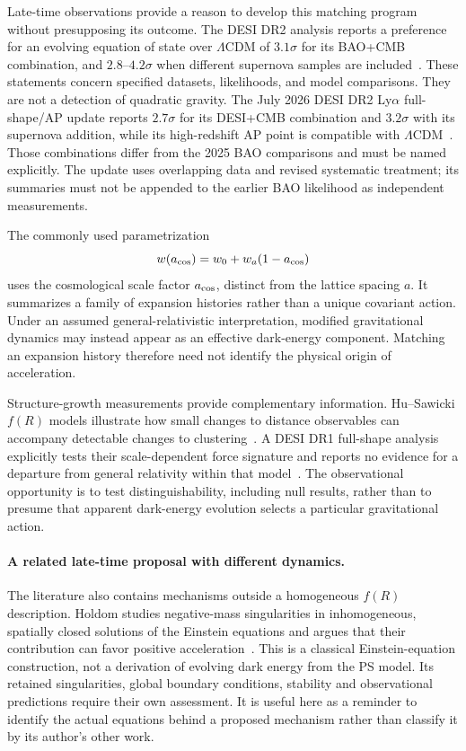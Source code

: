 Late-time observations provide a reason to develop this matching program without presupposing its outcome.  The DESI DR2 analysis reports a preference for an evolving equation of state over $\Lambda$CDM of $3.1\sigma$ for its BAO+CMB combination, and $2.8$--$4.2\sigma$ when different supernova samples are included~\cite{DESI:2025DR2}.  These statements concern specified datasets, likelihoods, and model comparisons.  They are not a detection of quadratic gravity.  The July 2026 DESI DR2 Ly$\alpha$ full-shape/AP update reports $2.7\sigma$ for its DESI+CMB combination and $3.2\sigma$ with its supernova addition, while its high-redshift AP point is compatible with $\Lambda$CDM~\cite{DESI:2026AP}.  Those combinations differ from the 2025 BAO comparisons and must be named explicitly.  The update uses overlapping data and revised systematic treatment; its summaries must not be appended to the earlier BAO likelihood as independent measurements.

The commonly used parametrization
\begin{equation}
 w(a_{\rm cos})=w_0+w_a(1-a_{\rm cos})
 \label{eq:cpl-dark-energy}
\end{equation}
uses the cosmological scale factor $a_{\rm cos}$, distinct from the lattice spacing $a$.  It summarizes a family of expansion histories rather than a unique covariant action.  Under an assumed general-relativistic interpretation, modified gravitational dynamics may instead appear as an effective dark-energy component.  Matching an expansion history therefore need not identify the physical origin of acceleration.

Structure-growth measurements provide complementary information.  Hu--Sawicki $f(R)$ models illustrate how small changes to distance observables can accompany detectable changes to clustering~\cite{HuSawicki:2007}.  A DESI DR1 full-shape analysis explicitly tests their scale-dependent force signature and reports no evidence for a departure from general relativity within that model~\cite{Gonzalez:2026}.  The observational opportunity is to test distinguishability, including null results, rather than to presume that apparent dark-energy evolution selects a particular gravitational action.

\paragraph*{A related late-time proposal with different dynamics.}
The literature also contains mechanisms outside a homogeneous $f(R)$ description.  Holdom studies negative-mass singularities in inhomogeneous, spatially closed solutions of the Einstein equations and argues that their contribution can favor positive acceleration~\cite{Holdom:2026NegativeMass}.  This is a classical Einstein-equation construction, not a derivation of evolving dark energy from the PS model.  Its retained singularities, global boundary conditions, stability and observational predictions require their own assessment.  It is useful here as a reminder to identify the actual equations behind a proposed mechanism rather than classify it by its author's other work.

